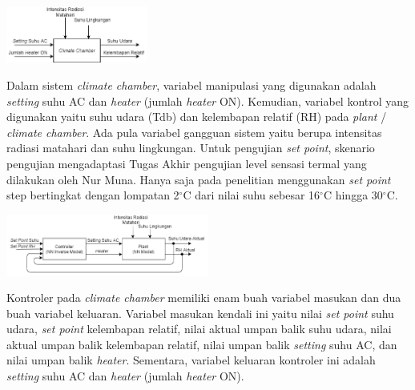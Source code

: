 \documentclass[a4paper,10pt]{article}
\makeatletter
\newenvironment{body}{\begin{multicols}{2}}{\end{multicols}}
\renewenvironment{figure}
{\def\@captype{figure}%
	\captionsetup{labelsep=period,format=hang,font=footnotesize,justification=justified}
}
{}
\makeatother
\begin{document}
\begin{body}
		\begin{figure}
			\centering
			\includegraphics[width=0.35\textwidth]{figures/BlokDiagramPlant}
			\caption{Diagram Blok \textit{Plant}}
			\label{fig:5:DiagramBlokPlant}
		\end{figure}
		\vspace{1em}
		
		Dalam sistem \textit{climate chamber}, variabel manipulasi yang digunakan adalah \textit{setting} suhu AC dan \textit{heater} (jumlah \textit{heater} ON). Kemudian, variabel kontrol yang digunakan yaitu suhu udara (Tdb) dan kelembapan relatif (RH) pada \textit{plant} / \textit{climate chamber}. Ada pula variabel gangguan sistem yaitu berupa intensitas radiasi matahari dan suhu lingkungan. Untuk pengujian \textit{set point}, skenario pengujian mengadaptasi Tugas Akhir pengujian level sensasi termal yang dilakukan oleh Nur Muna\cite{skripsiMuna}. Hanya saja pada penelitian menggunakan \textit{set point} step bertingkat dengan lompatan 2$^{\circ}$C dari nilai suhu sebesar 16$^{\circ}$C hingga 30$^{\circ}$C.\\
		
		\begin{figure}
			\centering
			\includegraphics[width=0.5\textwidth]{figures/DiagramBlokFungsionalSistem}
			\caption{Diagram Blok Fungsional Sistem}
			\label{fig:5:DiagramBlokSistem}
		\end{figure}
		
		Kontroler pada \textit{climate chamber} memiliki enam buah variabel masukan dan dua buah variabel keluaran. Variabel masukan kendali ini yaitu nilai \textit{set point} suhu udara, \textit{set point} kelembapan relatif, nilai aktual umpan balik suhu udara, nilai aktual umpan balik kelembapan relatif, nilai umpan balik \textit{setting} suhu AC, dan nilai umpan balik \textit{heater}. Sementara, variabel keluaran kontroler ini adalah \textit{setting} suhu AC dan \textit{heater} (jumlah \textit{heater} ON).
		

\end{body}
\end{document}
